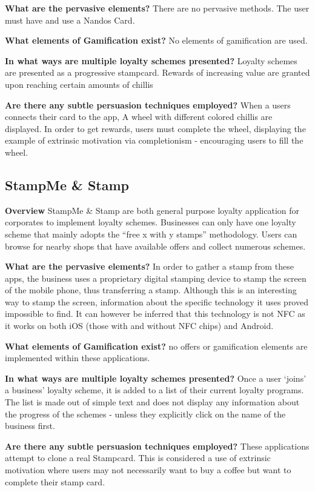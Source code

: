 \textbf{What are the pervasive elements?} There are no pervasive methods. The user must have and use a Nandos Card.

\textbf{What elements of Gamification exist?}
No elements of gamification are used.

\textbf{In what ways are multiple loyalty schemes presented?}
Loyalty schemes are presented as a progressive stampcard. Rewards of increasing value are granted upon reaching certain amounts of chillis

\textbf{Are there any subtle persuasion techniques employed?}
When a users connects their card to the app, A wheel with different colored chillis are displayed. In order to get rewards, users must complete the wheel, displaying the example of extrinsic motivation via completionism - encouraging users to fill the wheel. 
\subsection{StampMe \& Stamp}

\textbf{Overview}
StampMe \& Stamp are both general purpose loyalty application for corporates to implement loyalty schemes. Businesses can only have one loyalty scheme that mainly adopts the ``free x with y stamps'' methodology. Users can browse for nearby shops that have available offers and collect numerous schemes.

\textbf{What are the pervasive elements?}
In order to gather a stamp from these apps, the business uses a proprietary digital stamping device to stamp the screen of the mobile phone, thus transferring a stamp. Although this is an interesting way to stamp the screen, information about the specific technology it uses proved impossible to find. It can however be inferred that this technology is not NFC as it works on both iOS (those with and without NFC chips) and Android.

\textbf{What elements of Gamification exist?}
no offers or gamification elements are implemented within these applications. 

\textbf{In what ways are multiple loyalty schemes presented?}
Once a user `joins' a business' loyalty scheme, it is added to a list of their current loyalty programs. The list is made out of simple text and does not display any information about the progress of the schemes - unless they explicitly click on the name of the business first.

\textbf{Are there any subtle persuasion techniques employed?}
These applications attempt to clone a real Stampcard. This is considered a use of extrinsic motivation where users may not necessarily want to buy a coffee but want to complete their stamp card. 

